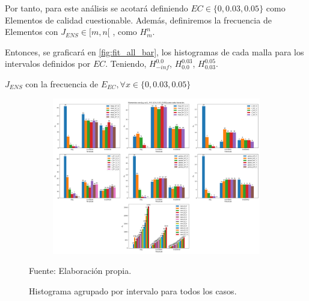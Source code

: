 Por tanto, para este análisis se acotará definiendo $EC \in \{0, 0.03, 0.05\}$ como Elementos de calidad cuestionable.
Además, definiremos la frecuencia de Elementos con $J_{ENS} \in [m, n[$ , como $H^{n}_{m}$.

Entonces, se graficará en \autoref{fig:fit_all_bar}, los histogramas de cada malla para los intervalos definidos por $EC$.
Teniendo, $H^{0.0}_{-inf}$, $H^{0.03}_{0.0}$, $H^{0.05}_{0.03}$.

 $J_{ENS}$ con la frecuencia de $E_{EC} , \forall x \in \{0, 0.03, 0.05\}$

\begin{figure}[!ht]
	\centering
	\begin{subfigure}[t]{1.0\textwidth}
		\includegraphics[width=0.75\paperheight, angle=90, origin=c]{figures/analysis/fit_all_bar.png}
	\end{subfigure}
	\caption{ Histograma agrupado por intervalo para todos los casos. }
	Fuente: Elaboración propia.
	\label{fig:fit_all_bar}
\end{figure}

